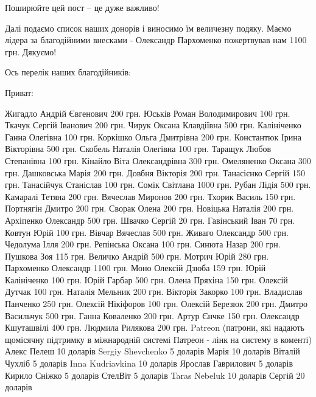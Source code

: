 
Поширюйте цей пост – це дуже важливо!

Далі подаємо список наших донорів і виносимо їм величезну подяку. Маємо лідера
за благодійними внесками - Олександр Пархоменко пожертвував нам 1100 грн.
Дякуємо!

Ось перелік наших благодійників:

\raggedcolumns
\begin{multicols}{3} %
\setlength{\parindent}{0pt}

Приват:

\obeycr
Жигадло Андрій Євгенович 200 грн.
Юськів Роман Володимирович 100 грн.
Ткачук Сергій Іванович 200 грн.
Чирук Оксана Клавдіївна 500 грн.
Калініченко Ганна Олегівна 100 грн.
Коркішко Ольга Дмитрівна 200 грн.
Константюк Ірина Вікторівна 500 грн.
Скобель Наталія Олегівна 100 грн.
Таращук Любов Степанівна 100 грн.
Кінайло Віта Олександрівна 300 грн.
Омеляненко Оксана 300 грн.
Дашковська Марія 200 грн.
Довбня Вікторія 200 грн.
Танасієнко Сергій 150 грн.
Танасійчук Станіслав 100 грн.
Сомік Світлана 1000 грн.
Рубан Лідія 500 грн.
Камаралі Тетяна 200 грн.
Вячеслав Миронов 200 грн.
Тхорик Василь 150 грн.
Портнягін Дмитро 200 грн.
Сворак Олена 200 грн.
Новіцька Наталія 200 грн.
Архіпенко Олександр 500 грн.
Швачко Сергій 20 грн.
Гавінський Іван 70 грн.
Ковтун Юрій 100 грн.
Вівчар Вячеслав 500 грн.
Живаго Олександр 500 грн.
Чедолума Ілля 200 грн.
Репінська Оксана 100 грн.
Синюта Назар 200 грн.
Пушкова Зоя 115 грн.
Величко Андрій 500 грн.
Мотрич Юрій    280 грн.
Пархоменко Олександр 1100 грн.
Моно
Олексій Дзюба 159 грн.
Юрій Калініченко 100 грн.
Юрій Гарбар 500 грн.
Олена Пряхіна 150 грн.
Олексій Дутчак 100 грн.
Наталія Мельник 200 грн.
Вікторія Закорко 100 грн.
Владислав Панченко 250 грн.
Олексій Нікіфоров 100 грн.
Олексій Березюк 200 грн.
Дмитро Васильчук   500 грн.
Ганна Коваленко 200 грн.
Артур Єнчке 150 грн.
Олександр Кшуташвілі 400 грн.
Людмила Рилякова 200 грн.
Patreon (патрони, які надають щомісячну підтримку в міжнародній системі Патреон - лінк на систему в коменті)
Алекс Пелеш 10 доларів
Sergiy Shevchenko 5 доларів
Марія 10 доларів
Віталій Чухліб 5 доларів
Inna Kudriavkina 10 доларів
Ярослав Гаврилович 5 доларів
Кирило Сніжко 5 доларів
СтелВіт 5 доларів
Taras Nebeluk 10 доларів
Сергій 20 доларів
\restorecr
\end{multicols} %
